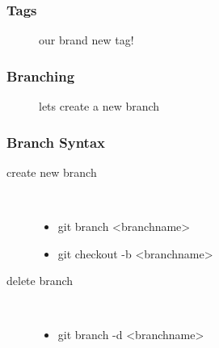 \begin{frame}[fragile]
    \frametitle{Tags}
    \mytag
    \begin{figure}[b]
        \centering
        \caption{our brand new tag!}
    \end{figure}
\end{frame}

\begin{frame}
    \frametitle{Branching}
    \begin{figure}[b]
        \centering
        \caption{lets create a new branch}
    \end{figure}
\end{frame}

\begin{frame}
    \frametitle{Branch Syntax}
    \begin{description}
        \item[create new branch] \hfill \\
            \begin{itemize}
                \item git branch <branchname>
                \item git checkout -b <branchname>
            \end{itemize}
        \item[delete branch] \hfill \\
            \begin{itemize}
                \item git branch -d <branchname>
            \end{itemize}
    \end{description}
\end{frame}


